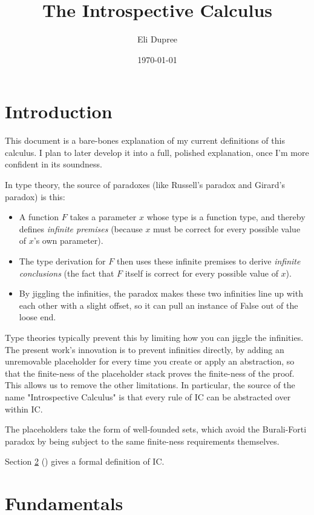 \documentclass{article}
\title{The Introspective Calculus}
\author{Eli Dupree}
\date{\today}
\begin{document}
  \maketitle
  
  \section{Introduction}
  
  This document is a bare-bones explanation of my current definitions of this calculus.
  I plan to later develop it into a full, polished explanation, once I'm more confident in its soundness.
  
  In type theory, the source of paradoxes (like Russell's paradox and Girard's paradox) is this:
  
  \begin{itemize}
    \item A function $F$ takes a parameter $x$ whose type is a function type, and thereby defines \emph{infinite premises} (because $x$ must be correct for every possible value of $x$'s own parameter).
    \item The type derivation for $F$ then uses these infinite premises to derive \emph{infinite conclusions} (the fact that $F$ itself is correct for every possible value of $x$).
    \item By jiggling the infinities, the paradox makes these two infinities line up with each other with a slight offset, so it can pull an instance of False out of the loose end.
  \end{itemize}
  
  Type theories typically prevent this by limiting how you can jiggle the infinities.
  The present work's innovation is to prevent infinities directly, by adding an unremovable placeholder for every time you create or apply an abstraction, so that the finite-ness of the placeholder stack proves the finite-ness of the proof.
  This allows us to remove the other limitations.
  In particular, the source of the name "Introspective Calculus" is that every rule of IC can be abstracted over within IC.

  The placeholders take the form of well-founded sets, which avoid the Burali-Forti paradox by being subject to the same finite-ness requirements themselves.


  
  Section \ref{fundamentals} (\textit{}) gives a formal definition of IC.  

  \section{Fundamentals}\label{fundamentals}
\end{document}
